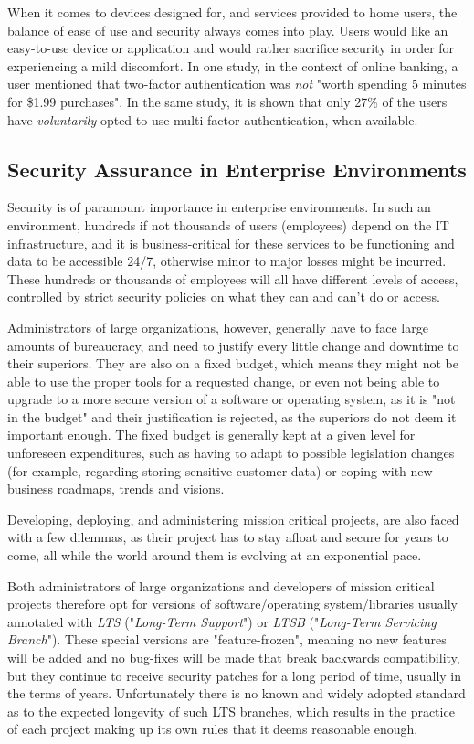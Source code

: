 \documentclass[a4paper,12pt]{article}
\begin{document}
	When it comes to devices designed for, and services provided to home users, the balance of ease of use and security always comes into play. Users would like an easy-to-use device or application and would rather sacrifice security in order for experiencing a mild discomfort. In one study, in the context of online banking, a user mentioned that two-factor authentication was \textit{not} "worth spending 5 minutes for \$1.99 purchases"\cite{ecrist14}. In the same study, it is shown that only 27\% of the users have \textit{voluntarily} opted to use multi-factor authentication, when available.
	
\subsection{Security Assurance in Enterprise Environments}

	Security is of paramount importance in enterprise environments. In such an environment, hundreds if not thousands of users (employees) depend on the IT infrastructure, and it is business-critical for these services to be functioning and data to be accessible 24/7, otherwise minor to major losses might be incurred. These hundreds or thousands of employees will all have different levels of access, controlled by strict security policies on what they can and can't do or access.
	
	Administrators of large organizations, however, generally have to face large amounts of bureaucracy, and need to justify every little change and downtime to their superiors. They are also on a fixed budget, which means they might not be able to use the proper tools for a requested change, or even not being able to upgrade to a more secure version of a software or operating system, as it is "not in the budget" and their justification is rejected, as the superiors do not deem it important enough. The fixed budget is generally kept at a given level for unforeseen expenditures, such as having to adapt to possible legislation changes (for example, regarding storing sensitive customer data) or coping with new business roadmaps, trends and visions.\cite{gkreiz06}
	
	Developing, deploying, and administering mission critical projects, are also faced with a few dilemmas, as their project has to stay afloat and secure for years to come, all while the world around them is evolving at an exponential pace.
	
	Both administrators of large organizations and developers of mission critical projects therefore opt for versions of software/operating system/libraries usually annotated with \textit{LTS} ("\textit{Long-Term Support}") or \textit{LTSB} ("\textit{Long-Term Servicing Branch}"). These special versions are "feature-frozen", meaning no new features will be added and no bug-fixes will be made that break backwards compatibility, but they continue to receive security patches for a long period of time, usually in the terms of years. Unfortunately there is no known and widely adopted standard as to the expected longevity of such LTS branches, which results in the practice of each project making up its own rules that it deems reasonable enough.
	
\end{document}
